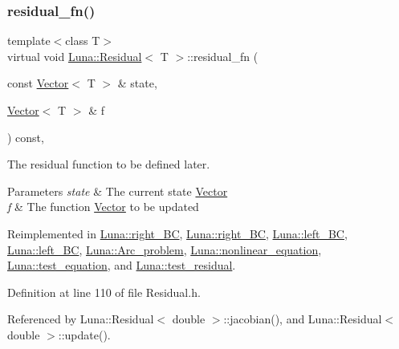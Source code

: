 \subsubsection{\texorpdfstring{residual\+\_\+fn()}{residual\_fn()}}
{\footnotesize\ttfamily template$<$class T$>$ \\
virtual void \hyperlink{classLuna_1_1Residual}{Luna\+::\+Residual}$<$ T $>$\+::residual\+\_\+fn (\begin{DoxyParamCaption}\item[{const \hyperlink{classLuna_1_1Vector}{Vector}$<$ T $>$ \&}]{state,  }\item[{\hyperlink{classLuna_1_1Vector}{Vector}$<$ T $>$ \&}]{f }\end{DoxyParamCaption}) const\hspace{0.3cm}{\ttfamily [inline]}, {\ttfamily [virtual]}}



The residual function to be defined later. 


\begin{DoxyParams}{Parameters}
{\em state} & The current state \hyperlink{classLuna_1_1Vector}{Vector} \\
\hline
{\em f} & The function \hyperlink{classLuna_1_1Vector}{Vector} to be updated \\
\hline
\end{DoxyParams}


Reimplemented in \hyperlink{classLuna_1_1right__BC_a513bb865a218a9ee309727839496afe0}{Luna\+::right\+\_\+\+BC}, \hyperlink{classLuna_1_1right__BC_a513bb865a218a9ee309727839496afe0}{Luna\+::right\+\_\+\+BC}, \hyperlink{classLuna_1_1left__BC_a01645de89a78c7c925d60bb68e994c90}{Luna\+::left\+\_\+\+BC}, \hyperlink{classLuna_1_1left__BC_a01645de89a78c7c925d60bb68e994c90}{Luna\+::left\+\_\+\+BC}, \hyperlink{classLuna_1_1Arc__problem_aeb5e14b8b06d0ad0f8b42cb280836f97}{Luna\+::\+Arc\+\_\+problem}, \hyperlink{classLuna_1_1nonlinear__equation_a5acffbdc83b8b487241cd92b0191be85}{Luna\+::nonlinear\+\_\+equation}, \hyperlink{classLuna_1_1test__equation_a90a4576ce51729e49dbe67f36ab31f81}{Luna\+::test\+\_\+equation}, and \hyperlink{classLuna_1_1test__residual_abf5e77702d2ffec8bf2ffdc6728a8473}{Luna\+::test\+\_\+residual}.



Definition at line 110 of file Residual.\+h.



Referenced by Luna\+::\+Residual$<$ double $>$\+::jacobian(), and Luna\+::\+Residual$<$ double $>$\+::update().


